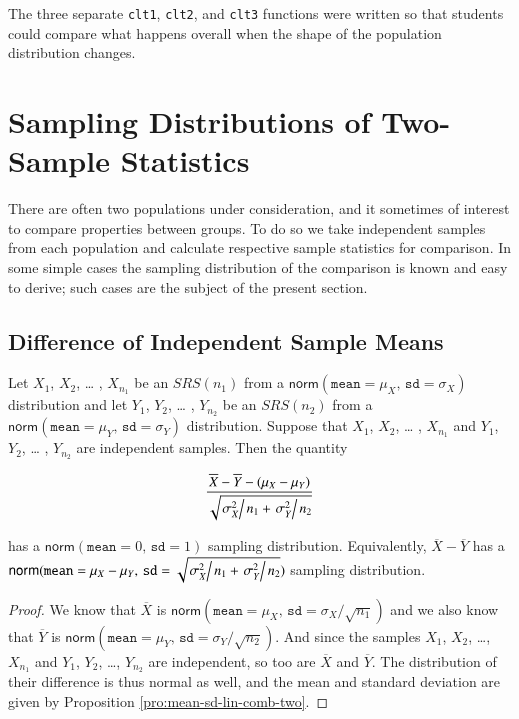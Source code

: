 \documentclass[]{book}
\numberwithin{equation}{chapter}
\numberwithin{figure}{chapter}
\theoremstyle{plain}
\theoremstyle{definition}
\theoremstyle{remark}
\theoremstyle{definition}
\theoremstyle{definition}
\theoremstyle{remark}
\let\BeginKnitrBlock\begin \let\EndKnitrBlock\end
\begin{document}
The three separate \texttt{clt1}, \texttt{clt2}, and \texttt{clt3}
functions were written so that students could compare what happens
overall when the shape of the population distribution changes.

\section{Sampling Distributions of Two-Sample
Statistics}\label{sec-samp-dist-two-samp}

There are often two populations under consideration, and it sometimes of
interest to compare properties between groups. To do so we take
independent samples from each population and calculate respective sample
statistics for comparison. In some simple cases the sampling
distribution of the comparison is known and easy to derive; such cases
are the subject of the present section.

\subsection{Difference of Independent Sample
Means}\label{difference-of-independent-sample-means}

\BeginKnitrBlock{proposition}
\protect\hypertarget{prp:unnamed-chunk-357}{}{\label{prp:unnamed-chunk-357}}Let
\(X_{1}\), \(X_{2}\), \ldots{} , \(X_{n_{1}}\) be an \(SRS(n_{1})\) from
a \(\mathsf{norm}(\mathtt{mean}=\mu_{X},\,\mathtt{sd}=\sigma_{X})\)
distribution and let \(Y_{1}\), \(Y_{2}\), \ldots{} , \(Y_{n_{2}}\) be
an \(SRS(n_{2})\) from a
\(\mathsf{norm}(\mathtt{mean}=\mu_{Y},\,\mathtt{sd}=\sigma_{Y})\)
distribution. Suppose that \(X_{1}\), \(X_{2}\), \ldots{} ,
\(X_{n_{1}}\) and \(Y_{1}\), \(Y_{2}\), \ldots{} , \(Y_{n_{2}}\) are
independent samples. Then the quantity

\begin{equation}
\label{eq-diff-indep-sample-means}
\frac{\overline{X}-\overline{Y}-(\mu_{X}-\mu_{Y})}{\sqrt{\left.\sigma_{X}^{2}\right/ n_{1}+\left.\sigma_{Y}^{2}\right/ n_{2}}}
\end{equation}

has a \(\mathsf{norm}(\mathtt{mean}=0,\,\mathtt{sd}=1)\) sampling
distribution. Equivalently, \(\overline{X}-\overline{Y}\) has a
\(\mathsf{norm}(\mathtt{mean}=\mu_{X}-\mu_{Y},\,\mathtt{sd}=\sqrt{\left.\sigma_{X}^{2}\right/ n_{1}+\left.\sigma_{Y}^{2}\right/ n_{2}})\)
sampling distribution.
\EndKnitrBlock{proposition}

\bigskip

\BeginKnitrBlock{proof}
\iffalse {Proof. } \fi We know that \(\overline{X}\) is
\(\mathsf{norm}(\mathtt{mean}=\mu_{X},\,\mathtt{sd}=\sigma_{X}/\sqrt{n_{1}})\)
and we also know that \(\overline{Y}\) is
\(\mathsf{norm}(\mathtt{mean}=\mu_{Y},\,\mathtt{sd}=\sigma_{Y}/\sqrt{n_{2}})\).
And since the samples \(X_{1}\), \(X_{2}\), \ldots{}, \(X_{n_{1}}\) and
\(Y_{1}\), \(Y_{2}\), \ldots{}, \(Y_{n_{2}}\) are independent, so too
are \(\overline{X}\) and \(\overline{Y}\). The distribution of their
difference is thus normal as well, and the mean and standard deviation
are given by Proposition \ref{pro:mean-sd-lin-comb-two}.
\EndKnitrBlock{proof}
\end{document}

